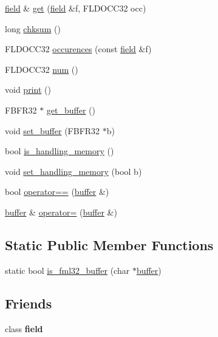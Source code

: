 \begin{DoxyCompactItemize}
\hyperlink{classatmi_1_1field}{field} \& \hyperlink{classatmi_1_1buffer_a864adb4d0153e6be38a7905c994915e1}{get} (\hyperlink{classatmi_1_1field}{field} \&f, F\+L\+D\+O\+C\+C32 occ)
\item 
long \hyperlink{classatmi_1_1buffer_a4ae9fa419098eb136ae3681ad90ccafb}{chksum} ()
\item 
F\+L\+D\+O\+C\+C32 \hyperlink{classatmi_1_1buffer_a57ff1b2ed449d59d4ec936e9e79a5d1a}{occurences} (const \hyperlink{classatmi_1_1field}{field} \&f)
\item 
F\+L\+D\+O\+C\+C32 \hyperlink{classatmi_1_1buffer_a3ec1c691a444915993628b2774503d18}{num} ()
\item 
void \hyperlink{classatmi_1_1buffer_a04d31b2fb8d27274ad81e8064eec3765}{print} ()
\item 
F\+B\+F\+R32 $\ast$ \hyperlink{classatmi_1_1buffer_aa9aa5382717ed17a2047db2779f8f0ec}{get\+\_\+buffer} ()
\item 
void \hyperlink{classatmi_1_1buffer_ade8853e7c2ae10dcd024b34049e99af3}{set\+\_\+buffer} (F\+B\+F\+R32 $\ast$b)
\item 
bool \hyperlink{classatmi_1_1buffer_aae543cf7816b338d20031993c18ce491}{is\+\_\+handling\+\_\+memory} ()
\item 
void \hyperlink{classatmi_1_1buffer_a68f05d1dbd040062850feeba5aa188fc}{set\+\_\+handling\+\_\+memory} (bool b)
\item 
bool \hyperlink{classatmi_1_1buffer_a580571a4a3cf75eafe90543e9ab07333}{operator==} (\hyperlink{classatmi_1_1buffer}{buffer} \&)
\item 
\hyperlink{classatmi_1_1buffer}{buffer} \& \hyperlink{classatmi_1_1buffer_a5cb08586cc2e633a3b0e80755dda53cd}{operator=} (\hyperlink{classatmi_1_1buffer}{buffer} \&)
\end{DoxyCompactItemize}
\subsection*{Static Public Member Functions}
\begin{DoxyCompactItemize}
\item 
static bool \hyperlink{classatmi_1_1buffer_a38aca9956db23474cb19d4c737b08262}{is\+\_\+fml32\+\_\+buffer} (char $\ast$\hyperlink{classatmi_1_1buffer}{buffer})
\end{DoxyCompactItemize}
\subsection*{Friends}
\begin{DoxyCompactItemize}
\item 
\hypertarget{classatmi_1_1buffer_acd53905ae10cba58b4337aefe648aec6}{class {\bfseries field}}\label{classatmi_1_1buffer_acd53905ae10cba58b4337aefe648aec6}

\end{DoxyCompactItemize}
